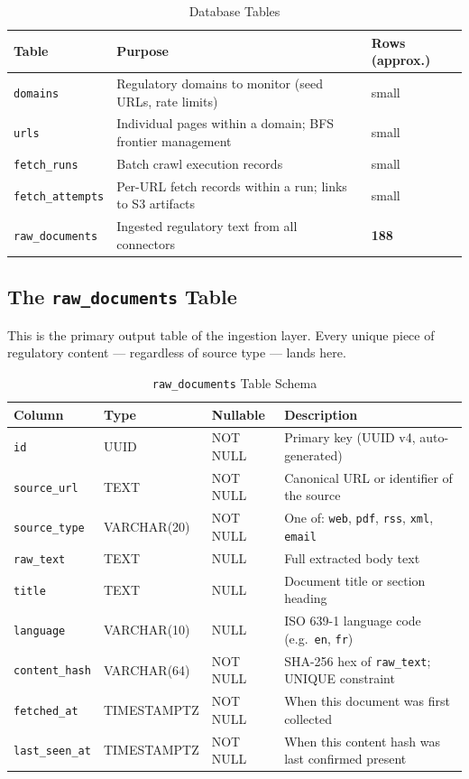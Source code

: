 \documentclass[12pt,a4paper]{article}
\begin{document}
\begin{table}[H]
\centering
\caption{Database Tables}\label{tab:tables}
\begin{tabularx}{\textwidth}{@{}l X l@{}}
\toprule
\textbf{Table} & \textbf{Purpose} & \textbf{Rows (approx.)} \\
\midrule
\texttt{domains}         & Regulatory domains to monitor (seed URLs, rate limits) & small \\
\texttt{urls}            & Individual pages within a domain; BFS frontier management & small \\
\texttt{fetch\_runs}     & Batch crawl execution records & small \\
\texttt{fetch\_attempts} & Per-URL fetch records within a run; links to S3 artifacts & small \\
\texttt{raw\_documents}  & Ingested regulatory text from all connectors & \textbf{188} \\
\bottomrule
\end{tabularx}
\end{table}

\subsection{The \texttt{raw\_documents} Table}

This is the primary output table of the ingestion layer. Every unique piece of regulatory content — regardless of source type — lands here.

\begin{table}[H]
\centering
\caption{\texttt{raw\_documents} Table Schema}\label{tab:rawdoc}
\begin{tabularx}{\textwidth}{@{}l l l X@{}}
\toprule
\textbf{Column} & \textbf{Type} & \textbf{Nullable} & \textbf{Description} \\
\midrule
\texttt{id}            & UUID            & NOT NULL & Primary key (UUID v4, auto-generated) \\
\texttt{source\_url}   & TEXT            & NOT NULL & Canonical URL or identifier of the source \\
\texttt{source\_type}  & VARCHAR(20)     & NOT NULL & One of: \texttt{web}, \texttt{pdf}, \texttt{rss}, \texttt{xml}, \texttt{email} \\
\texttt{raw\_text}     & TEXT            & NULL     & Full extracted body text \\
\texttt{title}         & TEXT            & NULL     & Document title or section heading \\
\texttt{language}      & VARCHAR(10)     & NULL     & ISO 639-1 language code (e.g.\ \texttt{en}, \texttt{fr}) \\
\texttt{content\_hash} & VARCHAR(64)     & NOT NULL & SHA-256 hex of \texttt{raw\_text}; UNIQUE constraint \\
\texttt{fetched\_at}   & TIMESTAMPTZ     & NOT NULL & When this document was first collected \\
\texttt{last\_seen\_at}& TIMESTAMPTZ     & NOT NULL & When this content hash was last confirmed present \\
\bottomrule
\end{tabularx}
\end{table}
\end{document}
